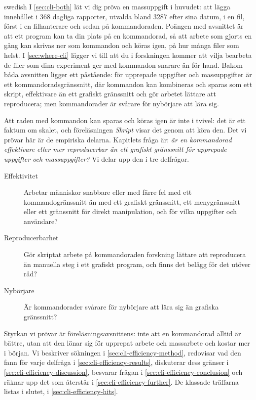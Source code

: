 \begin{onlyin}{swedish}
I \cref{sec:cli-both} lät vi dig pröva en massuppgift i huvudet: att
lägga innehållet i 368 dagliga rapporter, utvalda bland 3287 efter sina
datum, i en fil, först i en filhanterare och sedan på kommandoraden.
Poängen med avsnittet är att ett program kan ta din plats på en
kommandorad, så att arbete som gjorts en gång kan skrivas ner som
kommandon och köras igen, på hur många filer som helst.  I
\cref{sec:where-cli} lägger vi till att du i forskningen kommer att
vilja bearbeta de filer som dina experiment ger med kommandon snarare än
för hand.  Bakom båda avsnitten ligger ett påstående: för upprepade
uppgifter och massuppgifter är ett kommandoradsgränssnitt, där kommandon
kan kombineras och sparas som ett skript, effektivare än ett grafiskt
gränssnitt och gör arbetet lättare att reproducera; men kommandorader är
svårare för nybörjare att lära sig.

Att raden med kommandon kan sparas och köras igen är inte i tvivel: det
är ett faktum om skalet, och föreläsningen \emph{Skript} visar det genom
att köra den.  Det vi prövar här är de empiriska delarna.  Kapitlets
fråga är: \emph{är en kommandorad effektivare eller mer reproducerbar
än ett grafiskt gränssnitt för upprepade uppgifter och massuppgifter?}
Vi delar upp den i tre delfrågor.
\begin{description}
  \item[Effektivitet] Arbetar människor snabbare eller med färre fel
    med ett kommandogränssnitt än med ett grafiskt gränssnitt, ett
    menygränssnitt eller ett gränssnitt för direkt manipulation, och för
    vilka uppgifter och användare?
  \item[Reproducerbarhet] Gör skriptat arbete på kommandoraden forskning
    lättare att reproducera än manuella steg i ett grafiskt program, och
    finns det belägg för det utöver råd?
  \item[Nybörjare] Är kommandorader svårare för nybörjare att lära sig
    än grafiska gränssnitt?
\end{description}
Styrkan vi prövar är föreläsningsavsnittens: inte att en kommandorad
alltid är bättre, utan att den lönar sig för upprepat arbete och
massarbete och kostar mer i början.  Vi beskriver sökningen i
\cref{sec:cli-efficiency-method}, redovisar vad den fann för varje
delfråga i \cref{sec:cli-efficiency-results}, diskuterar dess gränser i
\cref{sec:cli-efficiency-discussion}, besvarar frågan i
\cref{sec:cli-efficiency-conclusion} och räknar upp det som återstår i
\cref{sec:cli-efficiency-further}.  De klassade träffarna listas i
slutet, i \cref{sec:cli-efficiency-hits}.
\end{onlyin}

